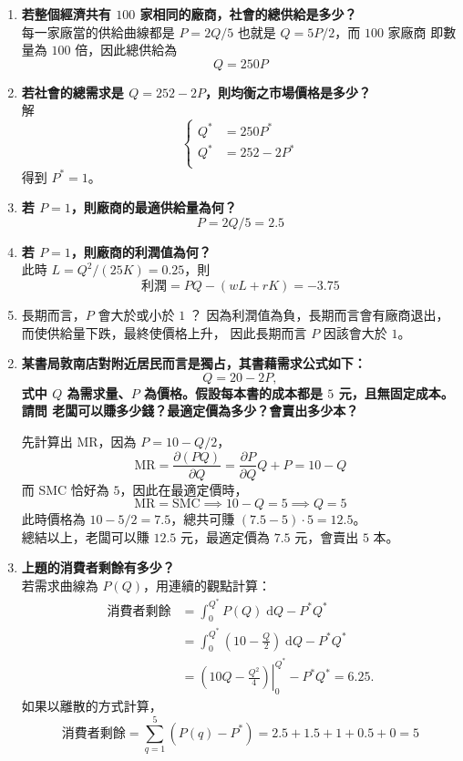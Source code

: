 \documentclass[12pt, a4paper]{article}
\newcommand{\dI}{\;\mathrm{d}}
\begin{document}
\begin{enumerate}[label={\bf 6.\arabic*}]
    \item {\bf 若整個經濟共有 $100$ 家相同的廠商，社會的總供給是多少？\\}
      每一家廠當的供給曲線都是 $P = 2Q / 5$ 也就是 $Q = 5P / 2$，而 $100$ 家廠商
      即數量為 $100$ 倍，因此總供給為
      \[ Q = 250P \]

    \item {\bf 若社會的總需求是 $Q = 252 - 2P$，則均衡之市場價格是多少？\\}
      解
      \[
        \left\{
          \begin{align*}
            Q^* &= 250P^* \\
            Q^* &= 252 - 2P^* \\
          \end{align*}
        \right.
      \]
      得到 $P^* = 1$。

    \item{\bf 若 $P = 1$，則廠商的最適供給量為何？}
      \[ P = 2Q / 5 = 2.5 \]

    \item{\bf 若 $P = 1$，則廠商的利潤值為何？\\}
      此時 $L = Q^2 / (25K) = 0.25$，則
      \[ \text{利潤} = PQ - (wL + rK) = -3.75 \]

    \item{長期而言，$P$ 會大於或小於 $1$ ？}
      因為利潤值為負，長期而言會有廠商退出，而使供給量下跌，最終使價格上升，
      因此長期而言 $P$ 因該會大於 $1$。
\end{enumerate}

\begin{enumerate}[label={\bf 7.\arabic*}]
    \setcounter{enumi}{1}
    \item {\bf 某書局敦南店對附近居民而言是獨占，其書藉需求公式如下：
        \[ Q = 20-2P, \]
      式中 $Q$ 為需求量、$P$ 為價格。假設每本書的成本都是 $5$ 元，且無固定成本。請問
      老闆可以賺多少錢？最適定價為多少？會賣出多少本？}

    先計算出 MR，因為 $P = 10 - Q/2$，
    \[ \text{MR} = \frac{\partial (PQ)}{\partial Q} = \frac{\partial P}{\partial Q}Q + P
      = 10 - Q \]
    而 SMC 恰好為 $5$，因此在最適定價時，
    \[ \text{MR} = \text{SMC} \implies 10 - Q = 5 \implies Q = 5 \]
    此時價格為 $10 - 5/2 = 7.5$，總共可賺 $(7.5 - 5) \cdot 5 = 12.5$。\\
    總結以上，老闆可以賺 $12.5$ 元，最適定價為 $7.5$ 元，會賣出 $5$ 本。
    
    \item {\bf 上題的消費者剩餘有多少？\\}
      若需求曲線為 $P(Q)$，用連續的觀點計算：
      \begin{align*}
        \text{消費者剩餘} &= \int_{0}^{Q^*} P(Q) \dI Q - P^* Q^*\\
        &= \int_{0}^{Q^*} \left(10 - \frac{Q}{2} \right) \dI Q - P^* Q^*\\
        &= \left. \left( 10Q - \frac{Q^2}{4} \right) \right|_{0}^{Q^*} - P^* Q^* = 6.25.
      \end{align*}
      如果以離散的方式計算，
      \[ \text{消費者剩餘} = \sum_{q=1}^{5} (P(q) - P^*) = 2.5+1.5+1+0.5+0 = 5 \]
 
  \end{enumerate}
\end{document}
